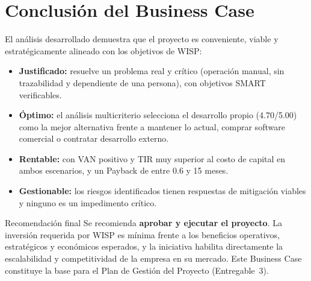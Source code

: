 \section{Conclusión del Business Case}
\label{sec:conclusion-bc}

El análisis desarrollado demuestra que el proyecto es conveniente, viable y
estratégicamente alineado con los objetivos de WISP:

\begin{itemize}[leftmargin=1.4em]
  \item \textbf{Justificado:} resuelve un problema real y crítico (operación manual,
  sin trazabilidad y dependiente de una persona), con objetivos SMART verificables.
  \item \textbf{Óptimo:} el análisis multicriterio selecciona el desarrollo propio
  (4.70/5.00) como la mejor alternativa frente a mantener lo actual, comprar software
  comercial o contratar desarrollo externo.
  \item \textbf{Rentable:} con VAN positivo y TIR muy superior al costo de capital en
  ambos escenarios, y un Payback de entre 0.6 y 15 meses.
  \item \textbf{Gestionable:} los riesgos identificados tienen respuestas de mitigación
  viables y ninguno es un impedimento crítico.
\end{itemize}

\begin{upeubox}{Recomendación final}
Se recomienda \textbf{aprobar y ejecutar el proyecto}. La inversión requerida por WISP
es mínima frente a los beneficios operativos, estratégicos y económicos esperados, y
la iniciativa habilita directamente la escalabilidad y competitividad de la empresa en
su mercado. Este Business Case constituye la base para el Plan de Gestión del Proyecto
(Entregable~3).
\end{upeubox}
